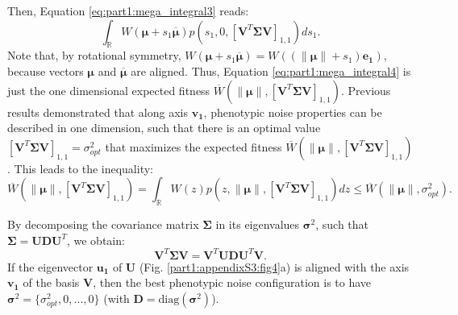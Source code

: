 Then, Equation \ref{eq:part1:mega_integral3} reads:
\begin{equation}
\int_{\mathbb{R}} W(\boldsymbol{\mu}+s_1 \overline{\boldsymbol{\mu}}) p(s_1,0,\left[\boldsymbol{V}^T\boldsymbol{\Sigma}\boldsymbol{V}\right]_{1,1}) ds_1.
\label{eq:part1:mega_integral4}
\end{equation}
Note that, by rotational symmetry, $W(\boldsymbol{\mu}+s_1 \overline{\boldsymbol{\mu}}) = W((\lVert \boldsymbol{\mu} \rVert + s_1)\boldsymbol{e_1})$, because vectors $\boldsymbol{\mu}$ and $\overline{\boldsymbol{\mu}}$ are aligned. Thus, Equation \ref{eq:part1:mega_integral4} is just the one dimensional expected fitness $\overline{W}(\lVert \boldsymbol{\mu} \rVert, \left[\boldsymbol{V}^T\boldsymbol{\Sigma}\boldsymbol{V}\right]_{1,1})$. Previous results demonstrated that along axis $\boldsymbol{v_1}$, phenotypic noise properties can be described in one dimension, such that there is an optimal value $\left[\boldsymbol{V}^T\boldsymbol{\Sigma}\boldsymbol{V}\right]_{1,1} = \sigma_{opt}^2$ that maximizes the expected fitness $\overline{W}(\lVert \boldsymbol{\mu} \rVert, \left[\boldsymbol{V}^T\boldsymbol{\Sigma}\boldsymbol{V}\right]_{1,1})$. This leads to the inequality:
\begin{equation}
\overline{W}(\lVert \boldsymbol{\mu} \rVert, \left[\boldsymbol{V}^T\boldsymbol{\Sigma}\boldsymbol{V}\right]_{1,1}) = \int_{\mathbb{R}} W(z) p(z,\lVert \boldsymbol{\mu} \rVert,\left[\boldsymbol{V}^T\boldsymbol{\Sigma}\boldsymbol{V}\right]_{1,1}) dz
\leq
\overline{W}(\lVert \boldsymbol{\mu} \rVert, \sigma_{opt}^2).
\label{eq:part1:inequalitybis}
\end{equation}

By decomposing the covariance matrix $\boldsymbol{\Sigma}$ in its eigenvalues $\boldsymbol{\sigma}^2$, such that $\boldsymbol{\Sigma} = \boldsymbol{U}\boldsymbol{D}\boldsymbol{U}^T$, we obtain:
\begin{equation}
\boldsymbol{V}^T\boldsymbol{\Sigma}\boldsymbol{V} = \boldsymbol{V}^T\boldsymbol{U}\boldsymbol{D}\boldsymbol{U}^T\boldsymbol{V}.
\label{eq:part1:sigma_decomposition}
\end{equation}
If the eigenvector $\boldsymbol{u_1}$ of $\boldsymbol{U}$ (Fig. \ref{part1:appendixS3:fig4}a) is aligned with the axis $\boldsymbol{v_1}$ of the basis $\boldsymbol{V}$, then the best phenotypic noise configuration is to have $\boldsymbol{\sigma}^2 = \{\sigma_{opt}^2, 0, ..., 0\}$ (with $\boldsymbol{D} = \mathrm{diag}(\boldsymbol{\sigma}^2)$).

